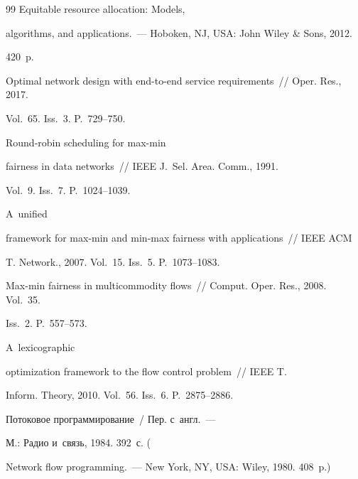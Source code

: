 {{\begin{thebibliography}{99}
 Equitable resource allocation: Models, 


algorithms, and applications.~--- Hoboken, NJ, USA: John Wiley \& Sons, 2012. 


420~p.


    






Optimal network design with end-to-end service requirements~/\!\!/ Oper. Res., 2017. 


Vol.~65. Iss.~3. P.~729--750.


    




 Round-robin scheduling for max-min 


fairness in data networks~/\!\!/ IEEE J.~Sel. Area. Comm., 1991. 


Vol.~9. Iss.~7. P.~1024--1039.


    




  A~unified 


framework for max-min and min-max fairness with applications~/\!\!/ IEEE ACM 


T. Network., 2007. Vol.~15. Iss.~5. P.~1073--1083.






Max-min fairness in multicommodity flows~/\!\!/ Comput. Oper. Res., 2008. Vol.~35. 


Iss.~2. P.~557--573.







 A~lexicographic 


optimization framework to the flow control problem~/\!\!/ IEEE T. 


Inform. Theory, 2010. Vol.~56. Iss.~6. P.~2875--2886.


    




 Потоковое программирование~/ Пер. с~англ.~--- 


М.: Радио и~связь, 1984. 392~с. ( 


Network flow programming.~--- New York, NY, USA: Wiley, 1980. 408~p.)





       \end{thebibliography}


} }











